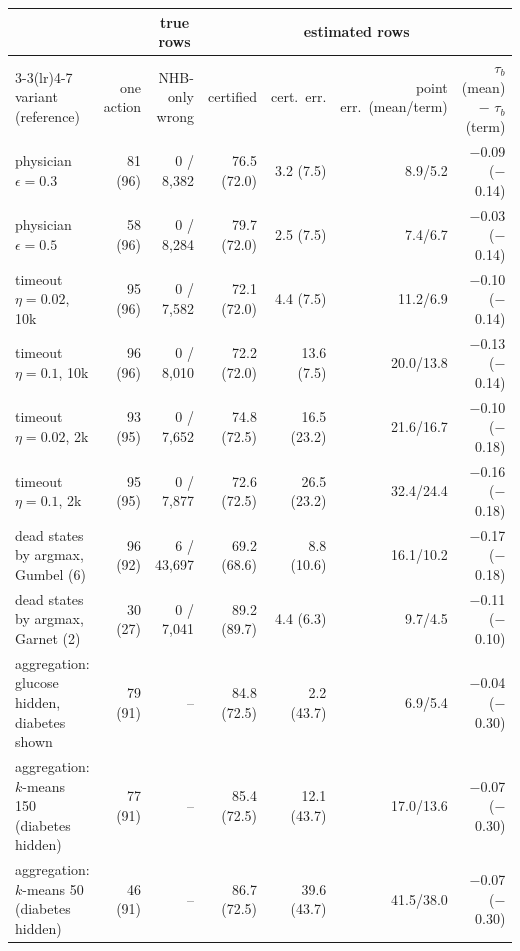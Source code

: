\begin{tabular}{lrrrrrr}
\toprule
& & \multicolumn{1}{c}{true rows} & \multicolumn{4}{c}{estimated rows} \\
\cmidrule(lr){3-3}\cmidrule(lr){4-7}
variant (reference) & one action & NHB-only wrong & certified & cert.\ err. & point err.\ (mean/term) & $\tau_b$(mean) $-$ $\tau_b$(term) \\
\midrule
physician $\epsilon{=}0.3$ & 81 (96) & 0 / 8{,}382 & 76.5 (72.0) & 3.2 (7.5) & 8.9/5.2 & $-$0.09 ($-$0.14) \\
physician $\epsilon{=}0.5$ & 58 (96) & 0 / 8{,}284 & 79.7 (72.0) & 2.5 (7.5) & 7.4/6.7 & $-$0.03 ($-$0.14) \\
\midrule
timeout $\eta{=}0.02$, 10k & 95 (96) & 0 / 7{,}582 & 72.1 (72.0) & 4.4 (7.5) & 11.2/6.9 & $-$0.10 ($-$0.14) \\
timeout $\eta{=}0.1$, 10k & 96 (96) & 0 / 8{,}010 & 72.2 (72.0) & 13.6 (7.5) & 20.0/13.8 & $-$0.13 ($-$0.14) \\
timeout $\eta{=}0.02$, 2k & 93 (95) & 0 / 7{,}652 & 74.8 (72.5) & 16.5 (23.2) & 21.6/16.7 & $-$0.10 ($-$0.18) \\
timeout $\eta{=}0.1$, 2k & 95 (95) & 0 / 7{,}877 & 72.6 (72.5) & 26.5 (23.2) & 32.4/24.4 & $-$0.16 ($-$0.18) \\
\midrule
dead states by argmax, Gumbel (6) & 96 (92) & 6 / 43{,}697 & 69.2 (68.6) & 8.8 (10.6) & 16.1/10.2 & $-$0.17 ($-$0.18) \\
dead states by argmax, Garnet (2) & 30 (27) & 0 / 7{,}041 & 89.2 (89.7) & 4.4 (6.3) & 9.7/4.5 & $-$0.11 ($-$0.10) \\
\midrule
aggregation: glucose hidden, diabetes shown & 79 (91) & -- & 84.8 (72.5) & 2.2 (43.7) & 6.9/5.4 & $-$0.04 ($-$0.30) \\
aggregation: $k$-means 150 (diabetes hidden) & 77 (91) & -- & 85.4 (72.5) & 12.1 (43.7) & 17.0/13.6 & $-$0.07 ($-$0.30) \\
aggregation: $k$-means 50 (diabetes hidden) & 46 (91) & -- & 86.7 (72.5) & 39.6 (43.7) & 41.5/38.0 & $-$0.07 ($-$0.30) \\
\bottomrule
\end{tabular}
